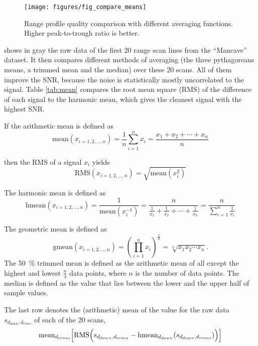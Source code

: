 \begin{figure}[htbp]
    \centering
    \texttt{[image: figures/fig\_compare\_means]}
    \caption{Range profile quality comparison with different averaging functions. Higher peak-to-trough ratio is better.}
    \label{fig:fig_compare_means}
\end{figure}

 shows in gray the raw data of the first 20 range scan lines
from the ``Mancave'' dataset. It then compares different methods of averaging (the three pythagoreans means, a trimmed mean and the median) over these 20 scans. All of them improve the SNR, because the noise is statistically mostly uncorrelated to the signal. Table \cref{tab:mean}
compares the root mean square (RMS) of the difference of each signal to the harmonic mean,
which gives the cleanest signal with the highest SNR.

If the arithmetic mean is defined as
\begin{equation}
        \text{mean}(x_{i=1,2,...,n}) = \frac{1}{n}\sum_{i=1}^n x_i=\frac{x_1+x_2+\cdots+x_n}{n}
\end{equation}

then the RMS of a signal $x_i$ yields
\begin{equation}
    \text{RMS}(x_{i=1,2,...,n}) = \sqrt{\text{mean}(x_i^2)}
\end{equation}

The harmonic mean is defined as
\begin{equation}
    \text{hmean}(x_{i=1,2,...,n})
    = \frac{1}{\text{mean}(x_i^{-1})}
    = \frac{n}{\frac1{x_1} + \frac1{x_2} + \cdots + \frac1{x_n}} = \frac{n}{\sum\limits_{i=1}^n \frac1{x_i}}
\end{equation}

The geometric mean is defined as
\begin{equation}
    \text{gmean}(x_{i=1,2,...,n}) = \left(\prod_{i=1}^n x_i \right)^\frac{1}{n} = \sqrt[n]{x_1 x_2 \cdots x_n}.
\end{equation}
The \SI{50}{\%} trimmed mean is defined as the arithmetic mean of all except
the highest and lowest \(\frac{n}4\) data points, where \(n\) is the
number of data points. The median is defined as the value that lies
between the lower and the upper half of sample values.

The last row denotes the (arithmetic) mean of the value for the raw data $s_{d_{down},d_{cross}}$ of each of the 20 scans,
\begin{equation}
    \text{mean}_{d_{cross}}\Bigl[
        \text{RMS}\Bigl(
            s_{d_{down},d_{cross}} - \text{hmean}_{d_{down}}(s_{d_{down},d_{cross}})
        \Bigr)
    \Bigr]
\end{equation}

